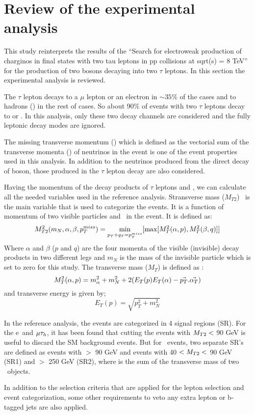 \section{Review of the experimental analysis}
This study reinterprets the results of the ``Search for electroweak production of charginos in final states with two tau leptons in pp collisions at sqrt(s) = 8 TeV''\cite{Khachatryan:2016trj} for the production of two \wprime bosons decaying into two $\tau$ leptons. In this section the experimental analysis is reviewed.

The $\tau$ lepton decays  to a $\mu$ lepton or an electron in $\sim 35\%$ of the cases and to hadrons (\Tau) in the rest of cases. So about 90\% of events with two $\tau$ leptons decay to \lepTau or \tauTau. In this analysis, only these two decay channels are considered and the fully leptonic decay modes are ignored. 

The missing transverse momentum (\MET) which is  defined as the vectorial sum of the transverse momenta (\pt) of neutrinos in the event is one of the event properties used in this analysis. In addition to the neutrinos  produced from the direct decay of \wprime boson, those produced in the $\tau$ lepton decay are also considered.

Having the momentum of the decay products of $\tau$ leptons and \MET, we can calculate all the needed variables used in the reference analysis. Stransverse mass ($M_{T2}$)~\cite{Lester:1999tx,Barr:2003rg}  is the main variable that is used to categorize the events. It is a function of momentum of two visible particles and \MET ~in the event. It is defined as:
\begin{equation}
M^2_{T2}(m_{N},\alpha,\beta,p_T^{miss}) = \displaystyle\min_{p_T+q_T=p_T^{miss}} [\max[M^2_{T}(\alpha,p),M^2_{T}(\beta,q)]]
\end{equation}
Where $\alpha$ and $\beta$ ($p$ and $q$) are the four momenta of the visible (invisible) decay products in two different legs and  $m_N$ is the mass of the invisible particle which is set to zero for this study. The transverse mass ($M_{T}$) is defined as :
\begin{equation}
M^2_{T}(\alpha,p) =  m^2_{\alpha}+m^2_N+2(E_T(p)E_T(\alpha)-\vec{p_T}.\vec{\alpha_T})
\end{equation}
and transverse energy is given by; 
\begin{equation}
E_T(p)=\sqrt{p^2_T+m^2_N}
\end{equation}

In the reference analysis, the events are categorized in 4 signal regions (SR). For the e\Tau ~and $\mu\tau_h$, it has been found that cutting the events with $M_{T2} <$ 90 GeV is useful to discard the SM background events. But for \tauTau ~events, two separate SR's are defined as events with \mttwo $>$ 90 GeV and events with 40 $<M_{T2}<$ 90 GeV (SR1) and \SumMT $>$ 250 GeV (SR2), where \SumMT is the sum of the transverse mass of two \Tau ~objects.

In addition to the selection criteria that are applied for the lepton selection and event categorization, some other requirements to veto any extra lepton or b-tagged jets  are also applied. 

